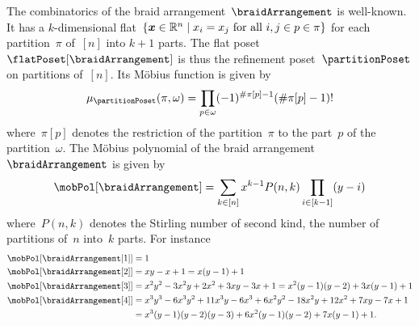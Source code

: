 \begin{remark}
The combinatorics of the braid arrangement~$\braidArrangement$ is well-known.
It has a $k$-dimensional flat~$\left\{ \boldsymbol{x} \in \mathbb R^n \;\middle|\; x_i = x_j \text{ for all } i, j \in p \in \pi \right\}$ for each partition~$\pi$ of~$[n]$ into $k+1$ parts.
The flat poset~$\flatPoset[\braidArrangement]$ is thus the refinement poset~$\partitionPoset$ on partitions of~$[n]$.
Its M\"obius function is given by
\[
\mu_{\partitionPoset}(\pi, \omega) = \prod_{p \in \omega} (-1)^{\#\pi[p]-1}(\#\pi[p]-1)!
\]
where~$\pi[p]$ denotes the restriction of the partition~$\pi$ to the part~$p$ of the partition~$\omega$.
The M\"obius polynomial of the braid arrangement~$\braidArrangement$ is given by
\[
\mobPol[\braidArrangement] = \sum_{k \in [n]} x^{k-1} P(n,k) \prod_{i \in [k-1]} (y-i)
\]
where~$P(n,k)$ denotes the Stirling number of second kind, \ie the number of partitions of~$n$ into~$k$ parts.
For instance
\begin{align*}
\mobPol[{\braidArrangement[1]}] & = 1 \\
\mobPol[{\braidArrangement[2]}] & = x y - x + 1 = x (y - 1) + 1 \\
\mobPol[{\braidArrangement[3]}] & = x^2 y^2 - 3 x^2 y + 2 x^2 + 3 x y - 3 x + 1 = x^2 (y - 1) (y - 2) + 3 x (y - 1) + 1\\
\mobPol[{\braidArrangement[4]}] & = x^3 y^3 - 6 x^3 y^2 + 11 x^3 y - 6 x^3 + 6 x^2 y^2 - 18 x^2 y + 12 x^2 + 7 x y - 7 x + 1 \\
& = x^3 (y - 1) (y - 2) (y - 3) + 6 x^2 (y - 1) (y - 2) + 7 x (y - 1) + 1.
\end{align*}
\begin{figure}


\end{figure}
\end{remark}
